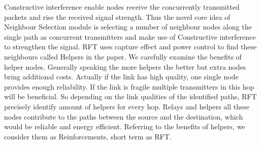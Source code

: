 \documentclass[conference]{IEEEtran}
\begin{document}
Constructive interference enable nodes receive the concurrently transmitted packets and rise the received signal strength. Thus the novel core idea of Neighbour Selection module is selecting a number of neighbour nodes along the single path as concurrent transmitters and make use of Constructive interference to strengthen the signal. RFT uses capture effect and power control to find these neighbours called Helpers in the paper. We carefully examine the benefits of helper nodes. Generally speaking the more helpers the better but extra nodes bring additional costs. Actually if the link has high quality, one single node provides enough reliability. If the link is fragile multiple transmitters in this hop will be beneficial. So depending on the link qualities of the identified paths, RFT precisely identify amount of helpers for every hop. Relays and helpers all these nodes contribute to the paths between the source and the destination, which would be reliable and energy efficient. Referring to the benefits of helpers, we consider them as Reinforcements, short term as RFT.



\end{document}
